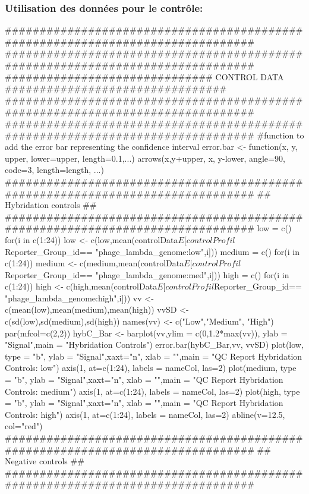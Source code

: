 \documentclass[a4paper,10pt]{article}
\begin{document}
\subsubsection{Utilisation des données pour le contrôle:}
\begin{Schunk}
\begin{Sinput}
 ###############################################################################
 ###############################################################################
 ############################## CONTROL DATA	################################
 ###############################################################################
 ###############################################################################
 #function to add the error bar representing the confidence interval
 error.bar <- function(x, y, upper, lower=upper, length=0.1,...){
   arrows(x,y+upper, x, y-lower, angle=90, code=3, length=length, ...)
 }
 ###############################################################################
 ## Hybridation controls                                                      ##
 ###############################################################################
 low = c()
 for(i in c(1:24)){
   low <- c(low,mean(controlData$E[controlProfil$Reporter_Group_id==
   "phage_lambda_genome:low",i]))
 }
 medium = c()
 for(i in c(1:24)){
   medium <- c(medium,mean(controlData$E[controlProfil$Reporter_Group_id==
   "phage_lambda_genome:med",i]))
 }
 high = c()
 for(i in c(1:24)){
   high <- c(high,mean(controlData$E[controlProfil$Reporter_Group_id==
   "phage_lambda_genome:high",i]))
 }
 vv <- c(mean(low),mean(medium),mean(high))
 vvSD <- c(sd(low),sd(medium),sd(high))
 names(vv) <- c("Low","Medium", "High")
 par(mfcol=c(2,2))
 hybC_Bar <- barplot(vv,ylim = c(0,1.2*max(vv)), ylab = "Signal",main = 
 "Hybridation Controls")
 error.bar(hybC_Bar,vv, vvSD)
 plot(low, type = "b", ylab = "Signal",xaxt="n", xlab = "",main = 
 "QC Report Hybridation Controls: low")
 axis(1, at=c(1:24), labels = nameCol, las=2)
 plot(medium, type = "b", ylab = "Signal",xaxt="n", xlab = "",main = 
 "QC Report Hybridation Controls: medium")
 axis(1, at=c(1:24), labels = nameCol, las=2)
 plot(high, type = "b", ylab = "Signal",xaxt="n", xlab = "",main = 
 "QC Report Hybridation Controls: high")
 axis(1, at=c(1:24), labels = nameCol, las=2)
 abline(v=12.5, col="red")
 ###############################################################################
 ## Negative controls                                                         ##
 ###############################################################################

\end{Sinput}
\end{Schunk}
\end{document}
